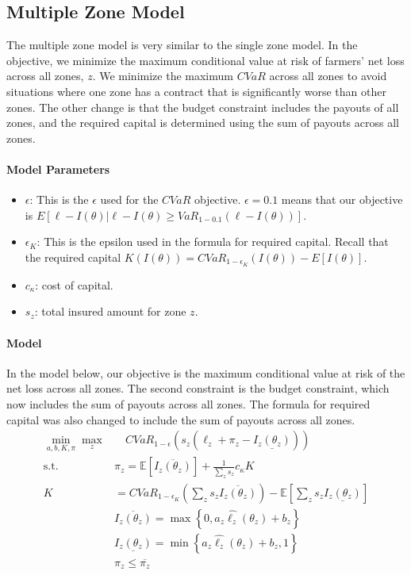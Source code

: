 \documentclass[11pt]{article}
\begin{document}
  \subsection{Multiple Zone Model}
  The multiple zone model is very similar to the single zone model. In the objective, we minimize the maximum conditional value at risk of  farmers' net loss across all zones, $z$. We minimize the maximum $CVaR$ across all zones to avoid situations where one zone has a contract that is significantly worse than other zones. The other change is that the budget constraint includes the payouts of all zones, and the required capital is determined using the sum of payouts across all zones.
    \paragraph*{Model Parameters}
    \begin{itemize}
        \item $\epsilon$: This is the $\epsilon$ used for the $CVaR$ objective.  $\epsilon = 0.1$ means that our objective is $E[\ell - I(\theta)|\ell -I(\theta) \geq VaR_{1-0.1}\left ( \ell - I(\theta) \right )]$.  
        \item $\epsilon_K$: This is the epsilon used in the formula for required capital. Recall that the required capital $K(I(\theta)) = CVaR_{1-\epsilon_K}(I(\theta)) - E[I(\theta)]$. 
        \item $c_{\kappa}$: cost of capital. 
        \item $s_z$: total insured amount for zone $z$.
    \end{itemize}

    \paragraph*{Model}
    In the model below, our objective is the maximum conditional value at risk of the net loss across all zones. The second constraint is the budget constraint, which now includes the sum of payouts across all zones. The formula for required capital was also changed to include the sum of payouts across all zones. 
    \begin{align}
      \min_{a,b,K,\pi} \max_z &\quad CVaR_{1-\epsilon}\left (s_z \left (\ell_z  + \pi_z - \underline{I_z(\theta_z)}\right ) \right )\\
      \text{s.t.   } & \pi_z  = \mathbb{E}\left [ \overline{I_z(\theta_z)} \right ] + \frac{1}{\sum_z s_z} c_{\kappa} K \\
      K &= CVaR_{1-\epsilon_K} \left( \sum_z s_z\overline{I_z(\theta_z)} \right ) - \mathbb{E}\left [ \sum_z s_z\underline{I_z(\theta_z)} \right ]\\
      &\overline{I_z(\theta_z)} = \max \left \{0,a_z\hat{\ell_z}(\theta_z) + b_z \right \}\\
      &\underline{I_z(\theta_z)} = \min \left \{a_z\hat{\ell_z}(\theta_z)+b_z,1 \right \}\\
      &\pi_z \leq \overline{\pi_z}
    \end{align}
\end{document}
